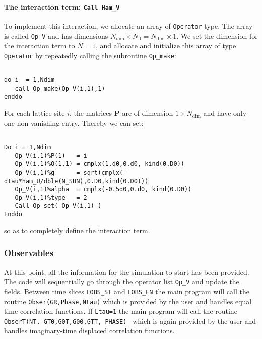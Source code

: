\documentclass{SciPost}
\begin{document}
%
\paragraph{The interaction term: \texttt{Call Ham\_V}}
%
To implement this interaction, we allocate an array of \texttt{Operator} type. The array is called  \texttt{Op\_V} and has dimensions $N_{\mathrm{dim}}\times N_{\mathrm{fl}}=N_{\mathrm{dim}} \times 1$. 
We set the dimension for the interaction term to  $N=1$, and  allocate and initialize this array of type  \texttt{Operator} by repeatedly calling the subroutine \texttt{Op\_make}: 

\begin{lstlisting}

do i  = 1,Ndim
   call Op_make(Op_V(i,1),1)
enddo

\end{lstlisting}
For each lattice site $i$, the  matrices ${\bm P}$ are of dimension $1\times N_{\mathrm{dim}} $ and have only one non-vanishing entry. Thereby we can set:

\begin{lstlisting}

Do i = 1,Ndim
   Op_V(i,1)%P(1)   = i
   Op_V(i,1)%O(1,1) = cmplx(1.d0,0.d0, kind(0.D0))
   Op_V(i,1)%g      = sqrt(cmplx(-dtau*ham_U/dble(N_SUN),0.D0,kind(0.D0)))
   Op_V(i,1)%alpha  = cmplx(-0.5d0,0.d0, kind(0.D0))
   Op_V(i,1)%type   = 2
   Call Op_set( Op_V(i,1) )
Enddo

\end{lstlisting}
so as to completely define the interaction term. 

%
\subsubsection{Observables}
%
At this point, all the information   for the simulation to  start has been provided.  The code will sequentially go through  the operator list  \texttt{Op\_V}  and update the  fields.   Between  time slices   \texttt{LOBS\_ST}  and  \texttt{LOBS\_EN}   the main program will call the routine  \texttt{Obser(GR,Phase,Ntau)}   which is provided by the user and handles equal time correlation functions. 
If \texttt{Ltau=1} the main program will call the routine \texttt{ObserT(NT,  GT0,G0T,G00,GTT, PHASE) }   which is again  provided by the user and handles  imaginary-time displaced correlation functions. 
\end{document}

